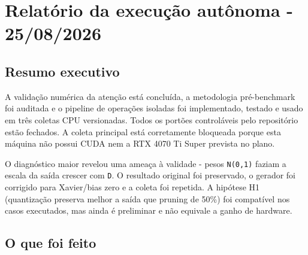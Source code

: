 

\chapter{Relatório da execução autônoma - 25/08/2026}



\section{Resumo executivo}







A validação numérica da atenção está concluída, a metodologia pré-benchmark foi auditada e o pipeline de operações isoladas foi implementado, testado e usado em três coletas CPU versionadas. Todos os portões controláveis pelo repositório estão fechados. A coleta principal está corretamente bloqueada porque esta máquina não possui CUDA nem a RTX 4070 Ti Super prevista no plano.







O diagnóstico maior revelou uma ameaça à validade - pesos \texttt{N(0,1)} faziam a escala da saída crescer com \texttt{D}. O resultado original foi preservado, o gerador foi corrigido para Xavier/bias zero e a coleta foi repetida. A hipótese H1 (quantização preserva melhor a saída que pruning de 50\%) foi compatível nos casos executados, mas ainda é preliminar e não equivale a ganho de hardware.



\section{O que foi feito}


